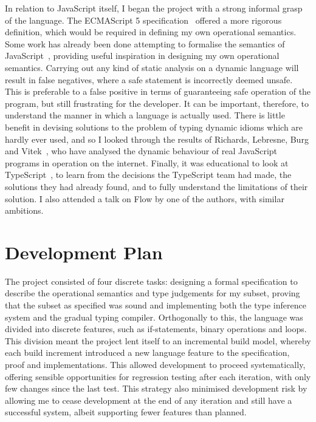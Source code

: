 \documentclass[12pt,a4paper,twoside,openright]{report}
\theoremstyle{definition}
\theoremstyle{dotless}
\begin{document}
In relation to JavaScript itself, I began the project with a strong informal
grasp of the language. The ECMAScript 5 specification~\cite{ecmaSpec} offered a
more rigorous definition, which would be required in defining my own
operational semantics. Some work has already been done attempting to formalise
the semantics of JavaScript~\cite{guha2010essence}, providing useful inspiration in designing my own
operational semantics. Carrying out any kind of static analysis on a dynamic
language will result in false negatives, where a safe statement is incorrectly
deemed unsafe. This is preferable to a false positive in terms of guaranteeing
safe operation of the program, but still frustrating for the developer. It can
be important, therefore, to understand the manner in which a language is
actually used. There is little benefit in devising solutions to the problem of
typing dynamic idioms which are hardly ever used, and so I looked through the
results of Richards, Lebresne, Burg and Vitek~\cite{JSBehaviour}, who have
analysed the dynamic behaviour of real JavaScript programs in operation on the
internet. Finally, it was educational to look at
TypeScript~\cite{ts,understandingTS}, to learn from the decisions the
TypeScript team had made, the solutions they had already found, and to fully
understand the limitations of their solution. I also attended a talk on Flow by
one of the authors, with similar ambitions.

\section{Development Plan}

The project consisted of four discrete tasks: designing a formal specification
to describe the operational semantics and type judgements for my subset,
proving that the subset as specified was sound and implementing both the type
inference system and the gradual typing compiler. Orthogonally to this, the
language was divided into discrete features, such as if-statements, binary
operations and loops. This division meant the project lent itself to an
incremental build model, whereby each build increment introduced a new language
feature to the specification, proof and implementations. This allowed
development to proceed systematically, offering sensible opportunities for
regression testing after each iteration, with only few changes since the last
test. This strategy also minimised development risk by allowing me to cease
development at the end of any iteration and still have a successful system,
albeit supporting fewer features than planned.
\end{document}
